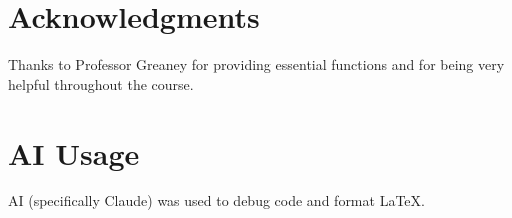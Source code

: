 \documentclass{article}
\begin{document}
\section{Acknowledgments}

Thanks to Professor Greaney for providing essential functions and for being very helpful throughout the course.

\section{AI Usage}

AI (specifically Claude) was used to debug code and format \LaTeX.
\end{document}
